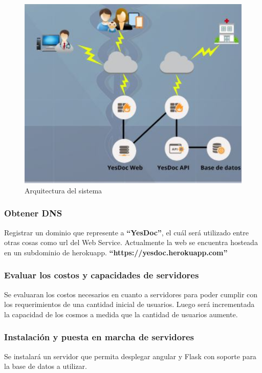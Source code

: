 \documentclass[a4paper,12pt]{article}
\begin{document}
 \begin{figure}
  \centering
  \includegraphics[width=.8\textwidth]{img/esq_funcionamiento}
  \caption{Arquitectura del sistema}
  \label{esq_funcionamiento}
\end{figure}


\subsubsection{Obtener DNS}
Registrar un dominio que represente a \textbf{``YesDoc''}, el cuál será utilizado entre otras cosas como url del Web Service.
Actualmente la web se encuentra hosteada en un subdominio de herokuapp. \textbf{``https://yesdoc.herokuapp.com''}

\subsubsection{Evaluar los costos y capacidades de servidores}
Se evaluaran los costos necesarios en cuanto a servidores para poder  cumplir con los requerimientos de una cantidad inicial de usuarios. Luego será incrementada la capacidad de los cosmos a medida que la cantidad de usuarios aumente. 

\subsubsection{Instalación y puesta en marcha de servidores}
Se instalará un servidor que permita desplegar angular y Flask con soporte para la base de     datos a utilizar. 
\end{document}
